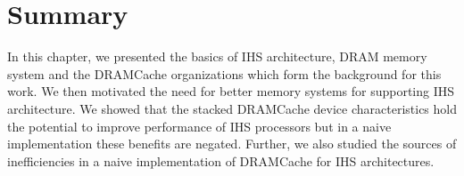 \section{Summary}
In this chapter, we presented the basics of IHS architecture, DRAM memory system and the DRAMCache organizations which form the background for this work. We then motivated the need for better memory systems for supporting IHS architecture. We showed that the stacked DRAMCache device characteristics hold the potential to improve performance of IHS processors but in a naive implementation these benefits are negated. Further, we also studied the sources of inefficiencies in a naive implementation of DRAMCache for IHS architectures.

